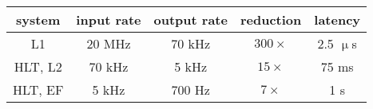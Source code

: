 \begin{tabular}{c|ccc|c}
  system  & input rate & output rate & reduction   & latency      \\
  \hline
  L1      & 20 MHz     & 70 kHz      & $300\times$ & 2.5 $\upmu$s \\
  HLT, L2 & 70 kHz     &  5 kHz      & $15\times$  & 75 ms        \\
  HLT, EF &  5 kHz     & 700 Hz      & $7\times$   & 1 s          \\
\end{tabular}

